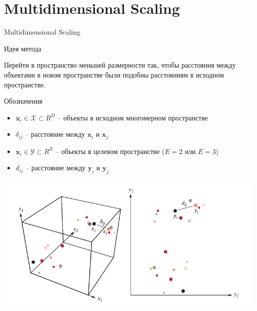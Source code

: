 \documentclass[10pt]{beamer}
\begin{document}
\section{Multidimensional Scaling}


\begin{frame}

\begin{center}
{\Large Multidimensional Scaling}
\end{center}

\end{frame}

\begin{frame}{Идея метода}

Перейти в пространство меньшей размерности так, чтобы расстояния между объектами в новом пространстве были подобны расстояниям в исходном пространстве.

\end{frame}

\begin{frame}{Обозначения}

\begin{itemize}
\item $\mathbf{x}_i \in \mathcal{X} \subset R^D$ -- объекты в исходном многомерном пространстве
\item $\delta_{ij}$ -- расстояние между $\mathbf{x}_i$ и $\mathbf{x}_j$
\item $\mathbf{x}_i \in \mathcal{Y} \subset R^E$ -- объекты в целевом пространстве ($E=2$ или $E=3$)
\item $d_{ij}$ -- расстояние между $\mathbf{y}_i$ и $\mathbf{y}_j$
\end{itemize}

\begin{center}
\includegraphics[scale=0.35]{images/mds.png}
\end{center}

\end{frame}
\end{document}
